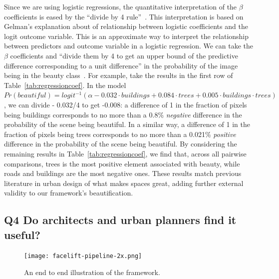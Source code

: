 Since we are using logistic regressions, the quantitative interpretation of the $\beta$ coefficients is eased by the ``divide by 4 rule''~\cite{gelman2006data}. This interpretation is based on Gelman's explanation about of relationship between logistic coefficients and the logit outcome variable. This is an approximate way to interpret the relationship between predictors and outcome variable in a logistic regression. 
We can take the $\beta$ coefficients and ``divide them by 4 to get an upper bound of the predictive difference corresponding to a unit difference'' in the probability of the image being in the beauty class~\cite{gelman2006data}. 
For example, take the results in the first row of Table~\ref{tab:regressioncoef}. In the model $Pr(beautiful) = logit^{-1}(\alpha - 0.032 \cdot buildings + 0.084 \cdot trees + 0.005 \cdot  buildings \cdot trees)$, we can divide - 0.032/4 to get -0.008: a difference of 1 in the fraction of pixels being buildings corresponds to no more than a 0.8\% \emph{negative} difference in the probability of the scene being beautiful. In a similar way, a difference of 1 in the fraction of pixels being trees corresponds to no more than a 0.021\% \emph{positive} difference in the probability of the scene being beautiful. By considering the remaining results in Table~\ref{tab:regressioncoef}, we find that, across all pairwise comparisons, trees is the most positive element associated with beauty, while roads and buildings are the most negative ones. These results match previous literature in urban design of what makes spaces great, adding further external validity to our framework's beautification. 




\subsection{Q4 Do architects and urban planners find it useful?}

\begin{figure}[ht]
    \centering
    \texttt{[image: facelift-pipeline-2x.png]}
    \caption{An end to end illustration of the framework.}
    \label{fig:framework}
\end{figure}


